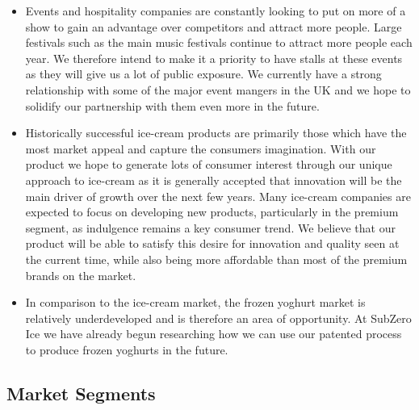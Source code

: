\documentclass{article}
\begin{document}
\begin{itemize}
  \item Events and hospitality companies are constantly looking to put on more of a show to gain an advantage over competitors and attract more people. Large festivals such as the main music festivals continue to attract more people each year. We therefore intend to make it a priority to have stalls at these events as they will give us a lot of public exposure. We currently have a strong relationship with some of the major event mangers in the UK and we hope to solidify our partnership with them even more in the future.

  \item Historically successful ice-cream products are primarily those which have the most market appeal and capture the consumers imagination. With our product we hope to generate lots of consumer interest through our unique approach to ice-cream as it is generally accepted that innovation will be the main driver of growth over the next few years. Many ice-cream companies are expected to focus on developing new products, particularly in the premium segment, as indulgence remains a key consumer trend. We believe that our product will be able to satisfy this desire for innovation and quality seen at the current time, while also being more affordable than most of the premium brands on the market.

  \item In comparison to the ice-cream market, the frozen yoghurt market is relatively underdeveloped and is therefore an area of opportunity. At SubZero Ice we have already begun researching how we can use our patented process to produce frozen yoghurts in the future.

  \end{itemize}


  \subsection{Market Segments}
\end{document}
